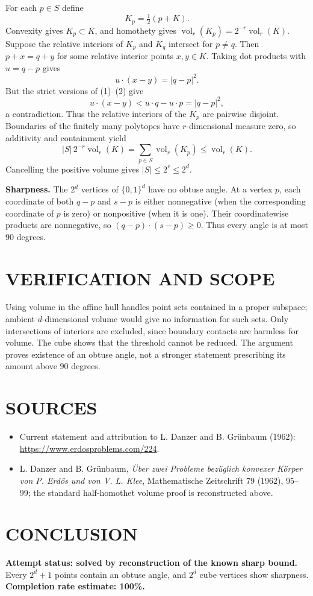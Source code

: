 For each $p\in S$ define
\[
K_p=\tfrac12(p+K).
\]
Convexity gives $K_p\subset K$, and homothety gives $\operatorname{vol}_r(K_p)=2^{-r}\operatorname{vol}_r(K)$. Suppose the relative interiors of $K_p$ and $K_q$ intersect for $p\ne q$. Then $p+x=q+y$ for some relative interior points $x,y\in K$. Taking dot products with $u=q-p$ gives
\[
u\cdot(x-y)=|q-p|^2.
\]
But the strict versions of (1)--(2) give
\[
u\cdot(x-y)<u\cdot q-u\cdot p=|q-p|^2,
\]
a contradiction. Thus the relative interiors of the $K_p$ are pairwise disjoint. Boundaries of the finitely many polytopes have $r$-dimensional measure zero, so additivity and containment yield
\[
|S|\,2^{-r}\operatorname{vol}_r(K)
=\sum_{p\in S}\operatorname{vol}_r(K_p)
\leq\operatorname{vol}_r(K).
\]
Cancelling the positive volume gives $|S|\leq2^r\leq2^d$.

\textbf{Sharpness.} The $2^d$ vertices of $\{0,1\}^d$ have no obtuse angle. At a vertex $p$, each coordinate of both $q-p$ and $s-p$ is either nonnegative (when the corresponding coordinate of $p$ is zero) or nonpositive (when it is one). Their coordinatewise products are nonnegative, so $(q-p)\cdot(s-p)\geq0$. Thus every angle is at most $90$ degrees.

\section{VERIFICATION AND SCOPE}
Using volume in the affine hull handles point sets contained in a proper subspace; ambient $d$-dimensional volume would give no information for such sets. Only intersections of interiors are excluded, since boundary contacts are harmless for volume. The cube shows that the threshold cannot be reduced. The argument proves existence of an obtuse angle, not a stronger statement prescribing its amount above $90$ degrees.

\section{SOURCES}
\begin{itemize}
\item Current statement and attribution to L. Danzer and B. Gr\"unbaum (1962): \url{https://www.erdosproblems.com/224}.
\item L. Danzer and B. Gr\"unbaum, \emph{\"Uber zwei Probleme bez\"uglich konvexer K\"orper von P. Erd\H{o}s und von V. L. Klee}, Mathematische Zeitschrift 79 (1962), 95--99; the standard half-homothet volume proof is reconstructed above.
\end{itemize}
\section{CONCLUSION}
\textbf{Attempt status: solved by reconstruction of the known sharp bound.} Every $2^d+1$ points contain an obtuse angle, and $2^d$ cube vertices show sharpness.
\textbf{Completion rate estimate: 100\%.}
